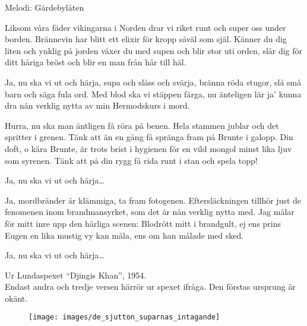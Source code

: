 \begin{song}

\begin{songmeta}
Melodi: Gärdebylåten
\end{songmeta}

\begin{songtext}
Liksom våra fäder vikingarna i Norden
drar vi riket runt och super oss under borden.
Brännevin har blitt ett elixir för kropp såväl som själ.
Känner du dig liten och ynklig på jorden
växer du med supen och blir stor uti orden,
slår dig för ditt håriga bröst
och blir en man från hår till häl.

Ja, nu ska vi ut och härja,
supa och slåss och svärja,
bränna röda stugor,
slå små barn och säga fula ord.
Med blod ska vi stäppen färga,
nu änteligen lär ja'
kunna dra nån verklig nytta
av min Hermodskurs i mord.

Hurra, nu ska man äntligen få röra på benen.
Hela stammen jublar och det spritter i grenen.
Tänk att än en gång få spränga fram på Brunte i galopp.
Din doft, o kära Brunte, är trots brist i hygienen
för en vild mongol minst lika ljuv som syrenen.
Tänk att på din rygg få rida runt i stan och spela topp!

Ja, nu ska vi ut och härja\ldots


Ja, mordbränder är klämmiga, ta fram fotogenen.
Eftersläckningen tillhör just de fenomenen
inom brandmansyrket, som det är nån verklig nytta med.
Jag målar för mitt inre upp den härliga scenen:
Blodrött mitt i brandgult, ej ens prins Eugen en
lika mustig vy kan måla, ens om han målade med sked.

Ja, nu ska vi ut och härja\ldots
\end{songtext}

\begin{songnotes}
Ur Lundaspexet \textquotedblleft{}Djingis Khan\textquotedblright{}, 1954. \\
Endast andra och tredje versen härrör ur spexet ifråga. Den förstas ursprung är okänt.
\end{songnotes}

\vfill
\begin{figure}[h!]
  \centering
  \texttt{[image: images/de\_sjutton\_suparnas\_intagande]}
\end{figure}
\vfill

\end{song}
